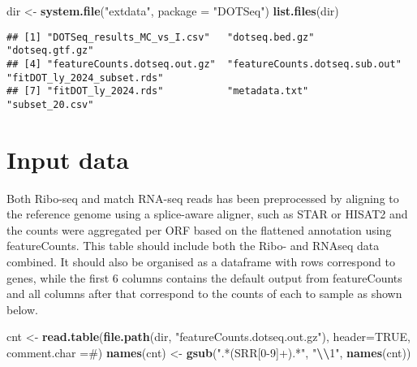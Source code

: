 \documentclass[
]{article}
\newenvironment{Shaded}{\begin{snugshade}}{\end{snugshade}}
\newcommand{\AttributeTok}[1]{\textcolor[rgb]{0.13,0.29,0.53}{#1}}
\newcommand{\ConstantTok}[1]{\textcolor[rgb]{0.56,0.35,0.01}{#1}}
\newcommand{\FunctionTok}[1]{\textcolor[rgb]{0.13,0.29,0.53}{\textbf{#1}}}
\newcommand{\NormalTok}[1]{#1}
\newcommand{\OtherTok}[1]{\textcolor[rgb]{0.56,0.35,0.01}{#1}}
\newcommand{\SpecialCharTok}[1]{\textcolor[rgb]{0.81,0.36,0.00}{\textbf{#1}}}
\newcommand{\StringTok}[1]{\textcolor[rgb]{0.31,0.60,0.02}{#1}}
\begin{document}
\begin{Shaded}
\begin{Highlighting}[]
\NormalTok{dir }\OtherTok{\textless{}{-}} \FunctionTok{system.file}\NormalTok{(}\StringTok{"extdata"}\NormalTok{, }\AttributeTok{package =} \StringTok{"DOTSeq"}\NormalTok{)}
\FunctionTok{list.files}\NormalTok{(dir)}
\end{Highlighting}
\end{Shaded}

\begin{verbatim}
## [1] "DOTSeq_results_MC_vs_I.csv"   "dotseq.bed.gz"                "dotseq.gtf.gz"               
## [4] "featureCounts.dotseq.out.gz"  "featureCounts.dotseq.sub.out" "fitDOT_ly_2024_subset.rds"   
## [7] "fitDOT_ly_2024.rds"           "metadata.txt"                 "subset_20.csv"
\end{verbatim}

\section{Input data}\label{input-data}

Both Ribo-seq and match RNA-seq reads has been preprocessed by aligning
to the reference genome using a splice-aware aligner, such as STAR or
HISAT2 and the counts were aggregated per ORF based on the flattened
annotation using featureCounts. This table should include both the Ribo-
and RNAseq data combined. It should also be organised as a dataframe
with rows correspond to genes, while the first 6 columns contains the
default output from featureCounts and all columns after that correspond
to the counts of each to sample as shown below.

\begin{Shaded}
\begin{Highlighting}[]
\NormalTok{cnt }\OtherTok{\textless{}{-}} \FunctionTok{read.table}\NormalTok{(}\FunctionTok{file.path}\NormalTok{(dir, }\StringTok{"featureCounts.dotseq.out.gz"}\NormalTok{), }\AttributeTok{header=}\ConstantTok{TRUE}\NormalTok{, }\AttributeTok{comment.char =}\StringTok{\textquotesingle{}\#\textquotesingle{}}\NormalTok{)}
\FunctionTok{names}\NormalTok{(cnt) }\OtherTok{\textless{}{-}} \FunctionTok{gsub}\NormalTok{(}\StringTok{".*(SRR[0{-}9]+).*"}\NormalTok{, }\StringTok{"}\SpecialCharTok{\textbackslash{}\textbackslash{}}\StringTok{1"}\NormalTok{, }\FunctionTok{names}\NormalTok{(cnt))}
\end{Highlighting}
\end{Shaded}
\end{document}
